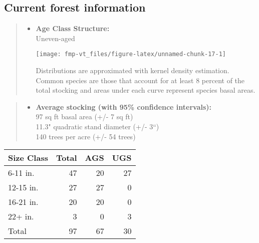 \documentclass[]{tufte-handout}
\providecommand{\tightlist}{%
  \setlength{\itemsep}{0pt}\setlength{\parskip}{0pt}}
\begin{document}
\subsection{Current forest
information}\label{current-forest-information-3}

\begin{quote}
\begin{itemize}
\tightlist
\item
  \textbf{Age Class Structure:}\\
  \vspace{2pt} Uneven-aged\\

  \begin{marginfigure}
  \texttt{[image: fmp-vt\_files/figure-latex/unnamed-chunk-17-1]} \caption[Distributions are approximated with kernel density estimation]{Distributions are approximated with kernel density estimation. Common species are those that account for at least 8 percent of the total stocking and areas under each curve represent species basal areas.}\label{fig:unnamed-chunk-17}
  \end{marginfigure}
\end{itemize}
\end{quote}

\begin{quote}
\begin{itemize}
\tightlist
\item
  \textbf{Average stocking (with 95\% confidence intervals):}\\
  \vspace{2pt} 97 sq ft basal area (+/- 7 sq ft)\\
  11.3" quadratic stand diameter (+/- 3``)\\
  140 trees per acre (+/- 54 trees)\\
  \vspace{8pt}
\end{itemize}
\end{quote}

\begin{tabular}{lrrr}
\toprule
Size Class & Total & AGS & UGS\\
\midrule
6-11 in. & 47 & 20 & 27\\
12-15 in. & 27 & 27 & 0\\
16-21 in. & 20 & 20 & 0\\
22+ in. & 3 & 0 & 3\\
Total & 97 & 67 & 30\\
\bottomrule
\end{tabular}
\end{document}
